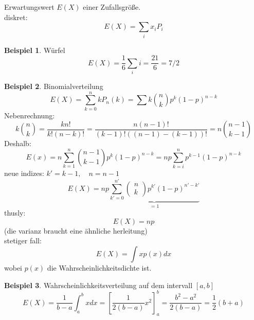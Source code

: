 \documentclass[a4paper]{article}
\theoremstyle{definition}
\newtheorem{beispiel}{Beispiel}%
\theoremstyle{remark}
\begin{document}
  Erwartungswert $E(X)$ einer Zufallsgröße. \\
  diskret:
  \begin{equation*}
  E(X)=\sum_i x_iP_i
  \end{equation*}
  \begin{beispiel}
    Würfel\\
    \begin{equation*}
  E(X)= \frac{1}{6}\sum_i i=\frac{21}{6}=7/2
    \end{equation*}
  \end{beispiel}
  \begin{beispiel}
    Binomialverteilung\\
    \begin{equation*}
    E(X)=  \sum_{k=0}^{n}kP_n(k)=\sum k \binom{n}{k}p^k(1-p)^{n-k}
    \end{equation*}
    Nebenrechnung:
\begin{equation*}
  k\binom{n}{k}= \frac{kn!}{k!(n-k)!}=\frac{n(n-1)!}{(k-1)!(( n-1)-(k-1))!}=n\binom{n-1}{k-1}
\end{equation*}
Deshalb:
    \begin{equation*}
E(x)=n\sum_{k=1}^n \binom {n-1}{k-1}p^k(1-p)^{n-k}=np\sum_{k=i}^n p^{k-1}(1-p)^{n-k}
\end{equation*}
  neue indizes: $k'=k-1,\quad n=n-1$\\
  \begin{equation*}
  E(X)= np   
  \underbrace{\sum_{k'=0}^{n'} \begin{pmatrix}
  n\\k
  \end{pmatrix}p^{k'}(1-p)^{n'-k'}}_{=1}
  \end{equation*}
  thusly:\\
  \begin{equation*}
  E(X)=np
  \end{equation*}
  (die varianz braucht eine ähnliche herleitung)\\
  stetiger fall:\\
  \begin{equation*}
  E(X)= \int xp(x)dx
  \end{equation*}
  wobei $p(x)$ die Wahrscheinlichkeitsdichte ist.

  \end{beispiel}
  \begin{beispiel}
   Wahrscheinlichkeitsverteilung auf dem intervall $[a,b]$ \\
  \begin{equation}
    E(X)= \frac{1}{b-a}\int_a^b xdx= \left[  \frac{1}{2(b-a)}x^2 \right]_a^b=\frac{b^2-a^2}{2(b-a)}=\frac{1}{2} (b+a)
  \end{equation}
\end{beispiel}
\end{document}
